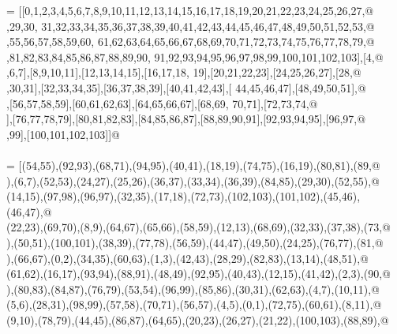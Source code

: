 \documentclass[11pt,oneside]{article}	%
\begin{document}
\begin{flushleft}
\begin{list}{}{}
\mbox{}\verb@FV = [[0,1,2,3,4,5,6,7,8,9,10,11,12,13,14,15,16,17,18,19,20,21,22,23,24,25,26,27,@\\
\mbox{},29,30, 31,32,33,34,35,36,37,38,39,40,41,42,43,44,45,46,47,48,49,50,51,52,53,@\\
\mbox{},55,56,57,58,59,60, 61,62,63,64,65,66,67,68,69,70,71,72,73,74,75,76,77,78,79,@\\
\mbox{},81,82,83,84,85,86,87,88,89,90, 91,92,93,94,95,96,97,98,99,100,101,102,103],[4,@\\
\mbox{},6,7],[8,9,10,11],[12,13,14,15],[16,17,18, 19],[20,21,22,23],[24,25,26,27],[28,@\\
\mbox{},30,31],[32,33,34,35],[36,37,38,39],[40,41,42,43],[ 44,45,46,47],[48,49,50,51],@\\
\mbox{}\verb@[52,53,54,55],[56,57,58,59],[60,61,62,63],[64,65,66,67],[68,69, 70,71],[72,73,74,@\\
\mbox{}],[76,77,78,79],[80,81,82,83],[84,85,86,87],[88,89,90,91],[92,93,94,95],[96,97,@\\
\mbox{},99],[100,101,102,103]]@\\
\mbox{}\verb@@\\
\mbox{}\verb@EV = [(54,55),(92,93),(68,71),(94,95),(40,41),(18,19),(74,75),(16,19),(80,81),(89,@\\
\mbox{}),(6,7),(52,53),(24,27),(25,26),(36,37),(33,34),(36,39),(84,85),(29,30),(52,55),@\\
\mbox{}\verb@(14,15),(97,98),(96,97),(32,35),(17,18),(72,73),(102,103),(101,102),(45,46),(46,47),@\\
\mbox{}\verb@(22,23),(69,70),(8,9),(64,67),(65,66),(58,59),(12,13),(68,69),(32,33),(37,38),(73,@\\
\mbox{}),(50,51),(100,101),(38,39),(77,78),(56,59),(44,47),(49,50),(24,25),(76,77),(81,@\\
\mbox{}),(66,67),(0,2),(34,35),(60,63),(1,3),(42,43),(28,29),(82,83),(13,14),(48,51),@\\
\mbox{}\verb@(61,62),(16,17),(93,94),(88,91),(48,49),(92,95),(40,43),(12,15),(41,42),(2,3),(90,@\\
\mbox{}),(80,83),(84,87),(76,79),(53,54),(96,99),(85,86),(30,31),(62,63),(4,7),(10,11),@\\
\mbox{}\verb@(5,6),(28,31),(98,99),(57,58),(70,71),(56,57),(4,5),(0,1),(72,75),(60,61),(8,11),@\\
\mbox{}\verb@(9,10),(78,79),(44,45),(86,87),(64,65),(20,23),(26,27),(21,22),(100,103),(88,89),@\\

\end{list}
\end{flushleft}
\end{document}
